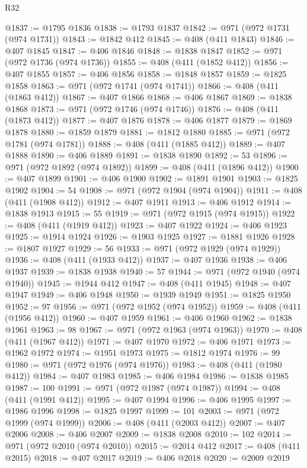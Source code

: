 \begin{lexlean}{R32}
\begin{coremodule}
@1837 := @1795 @1836
@1838 := @1793 @1837
@1842 := @971 (@972 @1731 (@974 @1731))
@1843 := @1842 @412
@1845 := @408 (@411 @1843)
@1846 := @407 @1845
@1847 := @406 @1846
@1848 := @1838 @1847
@1852 := @971 (@972 @1736 (@974 @1736))
@1855 := @408 (@411 (@1852 @412))
@1856 := @407 @1855
@1857 := @406 @1856
@1858 := @1848 @1857
@1859 := @1825 @1858
@1863 := @971 (@972 @1741 (@974 @1741))
@1866 := @408 (@411 (@1863 @412))
@1867 := @407 @1866
@1868 := @406 @1867
@1869 := @1838 @1868
@1873 := @971 (@972 @1746 (@974 @1746))
@1876 := @408 (@411 (@1873 @412))
@1877 := @407 @1876
@1878 := @406 @1877
@1879 := @1869 @1878
@1880 := @1859 @1879
@1881 := @1812 @1880
@1885 := @971 (@972 @1781 (@974 @1781))
@1888 := @408 (@411 (@1885 @412))
@1889 := @407 @1888
@1890 := @406 @1889
@1891 := @1838 @1890
@1892 := 53
@1896 := @971 (@972 @1892 (@974 @1892))
@1899 := @408 (@411 (@1896 @412))
@1900 := @407 @1899
@1901 := @406 @1900
@1902 := @1891 @1901
@1903 := @1825 @1902
@1904 := 54
@1908 := @971 (@972 @1904 (@974 @1904))
@1911 := @408 (@411 (@1908 @412))
@1912 := @407 @1911
@1913 := @406 @1912
@1914 := @1838 @1913
@1915 := 55
@1919 := @971 (@972 @1915 (@974 @1915))
@1922 := @408 (@411 (@1919 @412))
@1923 := @407 @1922
@1924 := @406 @1923
@1925 := @1914 @1924
@1926 := @1903 @1925
@1927 := @1881 @1926
@1928 := @1807 @1927
@1929 := 56
@1933 := @971 (@972 @1929 (@974 @1929))
@1936 := @408 (@411 (@1933 @412))
@1937 := @407 @1936
@1938 := @406 @1937
@1939 := @1838 @1938
@1940 := 57
@1944 := @971 (@972 @1940 (@974 @1940))
@1945 := @1944 @412
@1947 := @408 (@411 @1945)
@1948 := @407 @1947
@1949 := @406 @1948
@1950 := @1939 @1949
@1951 := @1825 @1950
@1952 := 97
@1956 := @971 (@972 @1952 (@974 @1952))
@1959 := @408 (@411 (@1956 @412))
@1960 := @407 @1959
@1961 := @406 @1960
@1962 := @1838 @1961
@1963 := 98
@1967 := @971 (@972 @1963 (@974 @1963))
@1970 := @408 (@411 (@1967 @412))
@1971 := @407 @1970
@1972 := @406 @1971
@1973 := @1962 @1972
@1974 := @1951 @1973
@1975 := @1812 @1974
@1976 := 99
@1980 := @971 (@972 @1976 (@974 @1976))
@1983 := @408 (@411 (@1980 @412))
@1984 := @407 @1983
@1985 := @406 @1984
@1986 := @1838 @1985
@1987 := 100
@1991 := @971 (@972 @1987 (@974 @1987))
@1994 := @408 (@411 (@1991 @412))
@1995 := @407 @1994
@1996 := @406 @1995
@1997 := @1986 @1996
@1998 := @1825 @1997
@1999 := 101
@2003 := @971 (@972 @1999 (@974 @1999))
@2006 := @408 (@411 (@2003 @412))
@2007 := @407 @2006
@2008 := @406 @2007
@2009 := @1838 @2008
@2010 := 102
@2014 := @971 (@972 @2010 (@974 @2010))
@2015 := @2014 @412
@2017 := @408 (@411 @2015)
@2018 := @407 @2017
@2019 := @406 @2018
@2020 := @2009 @2019

\end{coremodule}
\end{lexlean}
